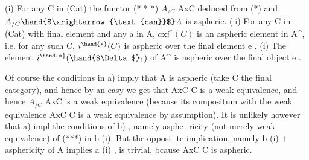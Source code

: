 
(i)   For any C in (Cat)  the functor
(* * *)   $A_{/C}$ \hand{$\longrightarrow$} AxC   deduced from (*)  and $A_{/C} \hand{$\xrightarrow{\text{can}}$} A$
   is aspheric.
(ii)  For any C in (Cat) with final element and any a in A,  $a\mathrm{x}i^{*}(C)$ is
an aspheric element in A\^{}, i.e. for any such C, $i^{\hand{*}}(C)$ is aspheric
over the final element e .
(i)   The element  $i^{\hand{*}}(\hand{$\Delta$}_1)$ of A\^{} is aspheric over the final object e .

Of course the conditions in a) imply that A is aspheric (take  C
the final category),  and hence  by an easy 
we get that  AxC \hand{$\rightarrow$} C is a weak equivalence, and hence $A_{/C}$ \hand{$\rightarrow$} AxC is
a weak equivalence (because its compositum with the weak equivalence
AxC \hand{$\rightarrow$} C is a weak equivalence by assumption).  It is  unlikely however
that  a)   impl the conditions of  b) ,  namely asphe-%
ricity (not merely weak equivalence) of (***) in  b (i).   But the opposi-%
te implication,  namely  b (i)  +  asphericity of A   implies a (i) ,
is trivial,  bcause AxC \hand{$\rightarrow$} C is aspheric.

